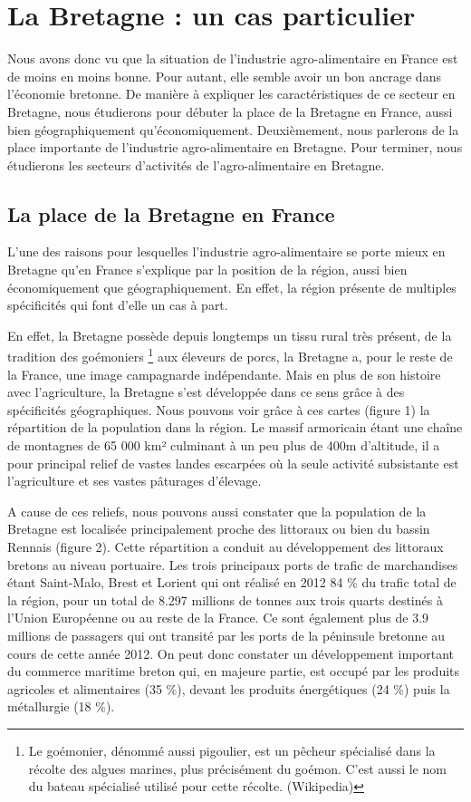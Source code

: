 \documentclass[a4paper,12pt]{report}
\begin{document}
	\section{La Bretagne : un cas particulier}
	Nous avons donc vu que la situation de l’industrie agro-alimentaire en France est de moins en moins bonne. Pour autant, elle semble avoir un bon ancrage dans l’économie bretonne. De manière à expliquer les caractéristiques de ce secteur en Bretagne, nous étudierons pour débuter la place de la Bretagne en France, aussi bien géographiquement qu’économiquement. Deuxièmement, nous parlerons de la place importante de l’industrie agro-alimentaire en Bretagne. Pour terminer, nous étudierons les secteurs d’activités de l’agro-alimentaire en Bretagne.

		\subsection{La place de la Bretagne en France}
			L’une des raisons pour lesquelles l’industrie agro-alimentaire se porte mieux en Bretagne qu’en France s’explique par la position de la région, aussi bien économiquement que géographiquement. En effet, la région présente de multiples spécificités qui font d’elle un cas à part.
			
			En effet, la Bretagne possède depuis longtemps un tissu rural très présent, de la tradition des goémoniers \footnote{Le goémonier, dénommé aussi pigoulier, est un pêcheur spécialisé dans la récolte des algues marines, plus précisément du goémon. C'est aussi le nom du bateau spécialisé utilisé pour cette récolte. (Wikipedia)} aux éleveurs de porcs, la Bretagne a, pour le reste de la France, une image campagnarde indépendante. Mais en plus de son histoire avec l’agriculture, la Bretagne s’est développée dans ce sens grâce à des spécificités géographiques. Nous pouvons voir grâce à ces cartes (figure 1) la répartition de la population dans la région. Le massif armoricain étant une chaîne de montagnes de 65 000 km² culminant à un peu plus de 400m d’altitude, il a pour principal relief de vastes landes escarpées où la seule activité subsistante est l’agriculture et ses vastes pâturages d’élevage.
			
			A cause de ces reliefs, nous pouvons aussi constater que la population de la Bretagne est localisée principalement proche des littoraux ou bien du bassin Rennais (figure 2). Cette répartition a conduit au développement des littoraux bretons au niveau portuaire. Les trois principaux ports de trafic de marchandises étant Saint-Malo, Brest et Lorient qui ont réalisé en 2012 84 \% du trafic total de la région, pour un total de 8.297 millions de tonnes aux trois quarts destinés à l’Union Européenne ou au reste de la France. Ce sont également plus de 3.9 millions de passagers qui ont transité par les ports de la péninsule bretonne au cours de cette année 2012\cite{CommerceMaritimeBretagne}. On peut donc constater un développement important du commerce maritime breton qui, en majeure partie, est occupé par les produits agricoles et alimentaires (35 \%), devant les produits énergétiques (24 \%) puis la métallurgie (18 \%).
			
\end{document}
